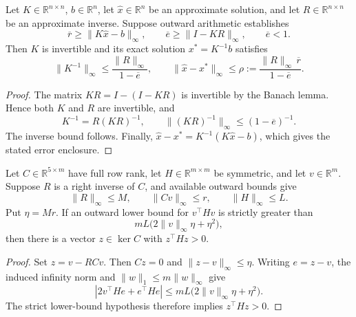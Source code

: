 \begin{lemma}%
\label{lem:kkt-verified-inverse-defect}
Let \(K\in\mathbb R^{n\times n}\), \(b\in\mathbb R^n\), let
\(\widehat x\in\mathbb R^n\) be an approximate solution, and let
\(R\in\mathbb R^{n\times n}\) be an approximate inverse.  Suppose outward
arithmetic establishes
\[
 \overline r\geq \lVert K\widehat x-b\rVert_\infty,\qquad
 \overline e\geq \lVert I-KR\rVert_\infty,\qquad
 \overline e<1.
\]
Then \(K\) is invertible and its exact solution \(x^*=K^{-1}b\) satisfies
\[
 \lVert K^{-1}\rVert_\infty
 \leq \frac{\lVert R\rVert_\infty}{1-\overline e},
 \qquad
 \lVert\widehat x-x^*\rVert_\infty
 \leq
 \rho:=
 \frac{\lVert R\rVert_\infty\,\overline r}{1-\overline e}.
\]
\end{lemma}

\begin{proof}
The matrix \(KR=I-(I-KR)\) is invertible by the Banach lemma.  Hence both
\(K\) and \(R\) are invertible, and
\[
 K^{-1}=R(KR)^{-1},\qquad
 \lVert(KR)^{-1}\rVert_\infty
 \leq (1-\overline e)^{-1}.
\]
The inverse bound follows.  Finally,
\(\widehat x-x^*=K^{-1}(K\widehat x-b)\), which gives the stated error
enclosure.
\end{proof}

\begin{lemma}%
\label{lem:kkt-certified-curvature-direction}
Let \(C\in\mathbb R^{5\times m}\) have full row rank, let
\(H\in\mathbb R^{m\times m}\) be symmetric, and let \(v\in\mathbb R^m\).
Suppose \(R\) is a right inverse of \(C\), and available outward bounds give
\[
 \|R\|_\infty\leq M,\qquad
 \|Cv\|_\infty\leq r,\qquad
 \|H\|_\infty\leq L.
\]
Put \(\eta=Mr\).  If an outward lower bound for \(v^\top Hv\) is strictly
greater than
\[
 mL\bigl(2\|v\|_\infty\eta+\eta^2\bigr),
\]
then there is a vector \(z\in\ker C\) with \(z^\top Hz>0\).
\end{lemma}

\begin{proof}
Set \(z=v-RCv\).  Then \(Cz=0\) and
\(\|z-v\|_\infty\leq\eta\).  Writing \(e=z-v\), the induced infinity norm
and \(\|w\|_1\leq m\|w\|_\infty\) give
\[
 |2v^\top He+e^\top He|
 \leq mL\bigl(2\|v\|_\infty\eta+\eta^2\bigr).
\]
The strict lower-bound hypothesis therefore implies \(z^\top Hz>0\).
\end{proof}

